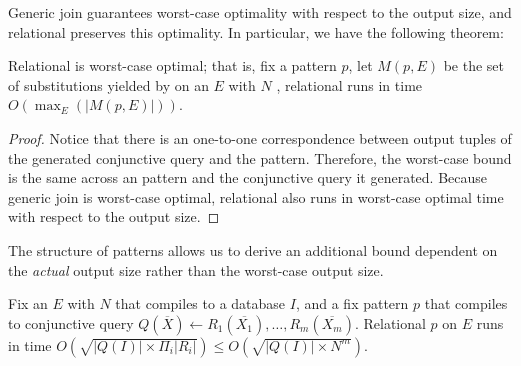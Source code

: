 
Generic join guarantees worst-case optimality with respect to the output size,
 and relational \ematching preserves this optimality.
In particular, we have the following theorem:
\begin{theorem}
  Relational \ematching is worst-case optimal; that is, fix a pattern $p$, let
  $M(p,E)$ be the set of substitutions yielded by \ematching on an \egraph $E$
  with $N$ \enodes, relational \ematching runs in time $O(\max_E(|M(p,E)|))$.
\end{theorem}

\begin{proof}
  Notice that there is an one-to-one correspondence between output tuples of
  the generated conjunctive query and the \ematching pattern. Therefore, the
  worst-case bound is the same across an \ematching pattern and the conjunctive
  query it generated. Because generic join is worst-case optimal, relational
  \ematching also runs in worst-case optimal time with respect to the output
  size.
\end{proof}

The structure of \ematching patterns allows us to derive an additional bound
 dependent on the {\em actual} output size rather than the worst-case output size.
\begin{theorem}
  Fix an \egraph $E$ with $N$ \enodes that compiles to a database $I$,
   and a fix pattern $p$ that compiles to conjunctive query
  $Q(\overline{X}) \gets R_1(\overline{X_1}),\ldots,R_m(\overline{X_m})$.
  Relational \ematching $p$ on $E$
   runs in time
   $O\left(\sqrt{|Q(I)| \times \Pi_{i}|R_i|}\right)
   \leq
    O\left(\sqrt{|Q(I)| \times N^m}\right)
   $.
\end{theorem}

